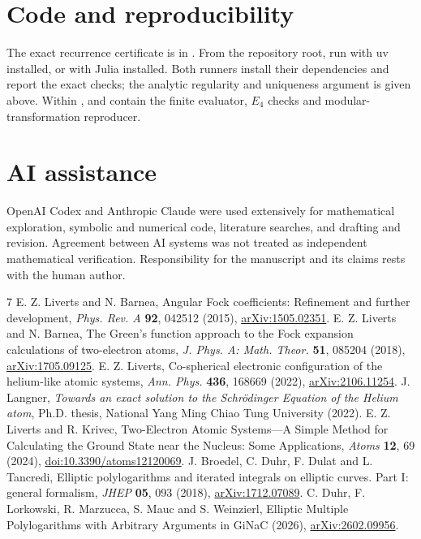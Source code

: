 \documentclass[10pt]{article}
\begin{document}
\section*{Code and reproducibility}
The exact recurrence certificate is in .
From the repository root, run  with uv installed, or  with Julia installed.
Both runners install their dependencies and report the exact checks; the analytic regularity and uniqueness argument is given above.
Within ,  and  contain the finite evaluator, $E_4$ checks and modular-transformation reproducer.

\section*{AI assistance}
OpenAI Codex and Anthropic Claude were used extensively for mathematical exploration, symbolic and numerical code, literature searches, and drafting and revision.
Agreement between AI systems was not treated as independent mathematical verification.
Responsibility for the manuscript and its claims rests with the human author.

{\small
\begin{thebibliography}{7}
\setlength{\itemsep}{0pt}
\setlength{\parskip}{0pt}
 E. Z. Liverts and N. Barnea, Angular Fock coefficients: Refinement and further development, \emph{Phys. Rev. A} \textbf{92}, 042512 (2015), \href{https://arxiv.org/abs/1505.02351}{arXiv:1505.02351}.
 E. Z. Liverts and N. Barnea, The Green's function approach to the Fock expansion calculations of two-electron atoms, \emph{J. Phys. A: Math. Theor.} \textbf{51}, 085204 (2018), \href{https://arxiv.org/abs/1705.09125}{arXiv:1705.09125}.
 E. Z. Liverts, Co-spherical electronic configuration of the helium-like atomic systems, \emph{Ann. Phys.} \textbf{436}, 168669 (2022), \href{https://arxiv.org/abs/2106.11254}{arXiv:2106.11254}.
 J. Langner, \emph{Towards an exact solution to the Schr\"odinger Equation of the Helium atom}, Ph.D. thesis, National Yang Ming Chiao Tung University (2022).
 E. Z. Liverts and R. Krivec, Two-Electron Atomic Systems---A Simple Method for Calculating the Ground State near the Nucleus: Some Applications, \emph{Atoms} \textbf{12}, 69 (2024), \href{https://doi.org/10.3390/atoms12120069}{doi:10.3390/atoms12120069}.
 J. Broedel, C. Duhr, F. Dulat and L. Tancredi, Elliptic polylogarithms and iterated integrals on elliptic curves. Part I: general formalism, \emph{JHEP} \textbf{05}, 093 (2018), \href{https://arxiv.org/abs/1712.07089}{arXiv:1712.07089}.
 C. Duhr, F. Lorkowski, R. Marzucca, S. Mauc and S. Weinzierl, Elliptic Multiple Polylogarithms with Arbitrary Arguments in GiNaC (2026), \href{https://arxiv.org/abs/2602.09956}{arXiv:2602.09956}.
\end{thebibliography}
}
\end{document}
